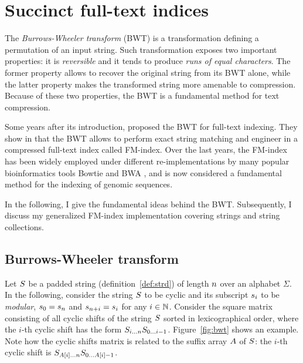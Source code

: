 \section{Succinct full-text indices}

The \emph{Burrows-Wheeler transform} (BWT) \citep{Burrows1994} is a transformation defining a permutation of an input string.
Such transformation exposes two important properties: it is \emph{reversible} and it tends to produce \emph{runs of equal characters}.
The former property allows to recover the original string from its BWT alone, while the latter property makes the transformed string more amenable to compression.
Because of these two properties, the BWT is a fundamental method for text compression.

Some years after its introduction, \citeauthor{Ferragina2000} proposed the BWT for full-text indexing.
They show in \citep{Ferragina2000} that the BWT allows to perform exact string matching and engineer in \citep{Ferragina2001} a compressed full-text index called FM-index.
Over the last years, the FM-index has been widely employed under different re-implementations by many popular bioinformatics tools \eg Bowtie \citep{Langmead2009} and BWA \citep{Li2009}, and is now considered a fundamental method for the indexing of genomic sequences.

In the following, I give the fundamental ideas behind the BWT.
Subsequently, I discuss my generalized FM-index implementation covering strings and string collections.

\subsection{Burrows-Wheeler transform}
\label{sec:index:bwt}

Let $S$ be a padded string (definition~\ref{def:strd}) of length $n$ over an alphabet $\Sigma$.
In the following, consider the string $S$ to be cyclic and its subscript $\Subscript{\String}{i}$ to be \emph{modular}, \eg $\Subscript{\String}{0} = \Subscript{\String}{\Slen}$ and $\Subscript{\String}{\Slen+i} = \Subscript{\String}{i}$ for any $i \in \mathbb {N}$.
Consider the square matrix consisting of all cyclic shifts of the string $S$ sorted in lexicographical order, where the $i$-th cyclic shift has the form ${S}_{{i}\dots{n}} {S}_{{0}\dots{i-1}}$.
Figure~\ref{fig:bwt} shows an example.
Note how the cyclic shifts matrix is related to the suffix array $A$ of $S$: the $i$-th cyclic shift is ${S}_{{A[i]}\dots{n}} {S}_{{0}\dots{A[i]-1}}$.

